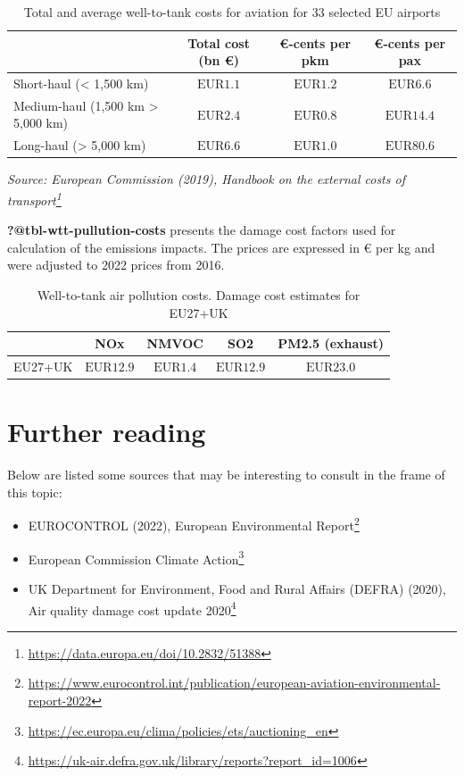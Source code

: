 \documentclass[
  11pt,
  a4paper,
]{book}
\DeclareRobustCommand{\href}[2]{#2\footnote{\url{#1}}}
\begin{document}
\hypertarget{tbl-wtt-costs}{}
\setlength{\LTpost}{0mm}
\begin{longtable}{lccc}
\caption{\label{tbl-wtt-costs}Total and average well-to-tank costs for aviation for 33 selected EU
airports }\tabularnewline

\toprule
  & Total cost (bn €) & €-cents per pkm & €-cents per pax \\ 
\midrule
Short-haul (< 1,500 km) & $\text{EUR}1.1$ & $\text{EUR}1.2$ & $\text{EUR}6.6$ \\ 
Medium-haul (1,500 km > 5,000 km) & $\text{EUR}2.4$ & $\text{EUR}0.8$ & $\text{EUR}14.4$ \\ 
Long-haul (> 5,000 km) & $\text{EUR}6.6$ & $\text{EUR}1.0$ & $\text{EUR}80.6$ \\ 
\bottomrule
\end{longtable}
\begin{minipage}{\linewidth}
\emph{Source: \href{https://data.europa.eu/doi/10.2832/51388}{European Commission (2019), Handbook on the external costs of transport}}\\
\end{minipage}

\textbf{?@tbl-wtt-pullution-costs} presents the damage cost factors used
for calculation of the emissions impacts. The prices are expressed in €
per kg and were adjusted to 2022 prices from 2016.

\hypertarget{tbl-wtt-pollution-costs}{}
\begin{longtable}{lcccc}
\caption{\label{tbl-wtt-pollution-costs}Well-to-tank air pollution costs. Damage cost estimates for EU27+UK }\tabularnewline

\toprule
  & NOx & NMVOC & SO2 & PM2.5 (exhaust) \\ 
\midrule
EU27+UK & $\text{EUR}12.9$ & $\text{EUR}1.4$ & $\text{EUR}12.9$ & $\text{EUR}23.0$ \\ 
\bottomrule
\end{longtable}

\hypertarget{further-reading}{%
\section{Further reading}\label{further-reading}}

Below are listed some sources that may be interesting to consult in the
frame of this topic:

\begin{itemize}
\item
  \href{https://www.eurocontrol.int/publication/european-aviation-environmental-report-2022}{EUROCONTROL
  (2022), European Environmental Report}
\item
  \href{https://ec.europa.eu/clima/policies/ets/auctioning_en}{European
  Commission Climate Action}
\item
  \href{https://uk-air.defra.gov.uk/library/reports?report_id=1006}{UK
  Department for Environment, Food and Rural Affairs (DEFRA) (2020), Air
  quality damage cost update 2020}
\end{itemize}
\end{document}

